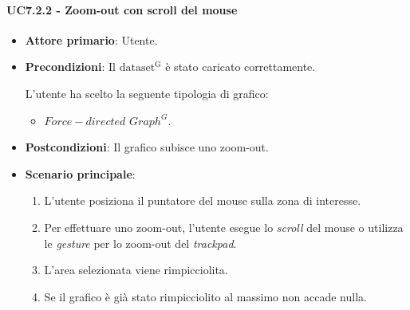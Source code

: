 \paragraph{UC7.2.2 - Zoom-out con scroll del mouse}
\label{sec:UC7.2.2}
\begin{itemize}
    \item \textbf{Attore primario}: Utente.
    \item \textbf{Precondizioni}: Il ${\mathrm{dataset^{G}}}$ è stato caricato correttamente. \par L'utente ha scelto la seguente tipologia di grafico:
    \begin{itemize}
          \item $Force-directed$ $Graph^{G}$.
    \end{itemize}
    \item \textbf{Postcondizioni}: Il grafico subisce uno zoom-out.
    \item \textbf{Scenario principale}:
          \begin{enumerate}
              \item L'utente posiziona il puntatore del mouse sulla zona di interesse.
              \item Per effettuare uno zoom-out, l'utente esegue lo \textit{scroll} del mouse o utilizza le \textit{gesture} per lo zoom-out del \textit{trackpad}.
              \item L'area selezionata viene rimpicciolita.
              \item Se il grafico è già stato rimpicciolito al massimo non accade nulla.
          \end{enumerate}
\end{itemize}

\newpage


